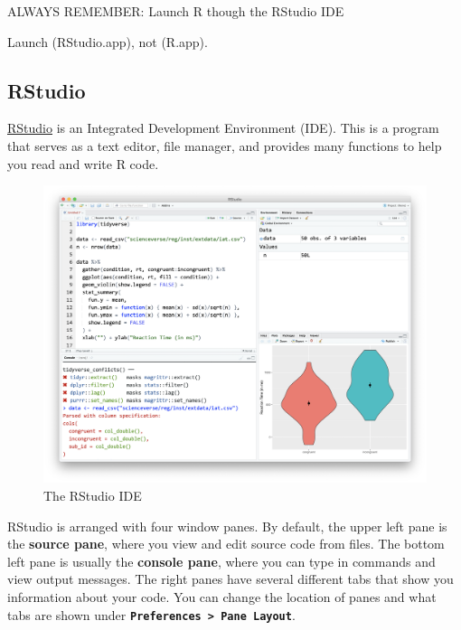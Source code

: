 \documentclass[
  oneside]{book}
\begin{document}
\begin{warning}
ALWAYS REMEMBER: Launch R though the RStudio IDE

Launch (RStudio.app), not (R.app).

\end{warning}

\hypertarget{rstudio_ide}{%
\subsection{RStudio}\label{rstudio_ide}}

\href{http://www.rstudio.com}{RStudio} is an Integrated Development Environment (IDE). This is a program that serves as a text editor, file manager, and provides many functions to help you read and write R code.

\begin{figure}

{\centering \includegraphics[width=1\linewidth]{images/01/rstudio} 

}

\caption{The RStudio IDE}\label{fig:img-rstudio}
\end{figure}

RStudio is arranged with four window panes. By default, the upper left pane is the \textbf{source pane}, where you view and edit source code from files. The bottom left pane is usually the \textbf{console pane}, where you can type in commands and view output messages. The right panes have several different tabs that show you information about your code. You can change the location of panes and what tabs are shown under \textbf{\texttt{Preferences\ \textgreater{}\ Pane\ Layout}}.
\end{document}
